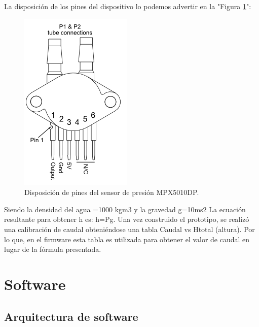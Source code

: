La disposición de los pines del dispositivo lo podemos advertir en la "Figura \ref{fig:disposición de pines del sensor}":
\begin{figure}
\centering
\includegraphics[scale=.65]{./Figures/DisposicionDePinesSensor.png}
\caption{Disposición de pines del sensor de presión MPX5010DP.}
\label{fig:disposición de pines del sensor}
\end{figure}

Siendo la densidad del agua =1000 kgm3  y la gravedad g=10ms2
La ecuación resultante para obtener h es: h=Pg. 
Una vez construido el prototipo, se realizó una calibración de caudal obteniéndose una tabla Caudal vs Htotal (altura). Por lo que, en el firmware esta tabla es utilizada para obtener el valor de caudal  en lugar de la fórmula presentada.
\section{Software}
\subsection{Arquitectura de software}
\label{subsec:Arquitectura de software}

